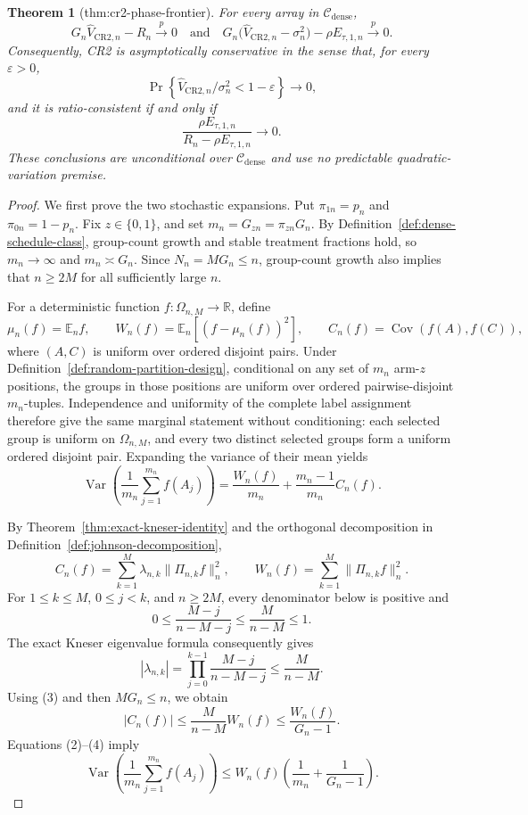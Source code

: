 \documentclass{article}
\newtheorem{theorem}{Theorem}
\begin{document}
\begin{theorem}[thm:cr2-phase-frontier]\label{thm:cr2-phase-frontier}
For every array in \(\mathcal C_{\mathrm{dense}}\),
\[
 G_n\widehat V_{\mathrm{CR2},n}-R_n\xrightarrow{p}0
 \quad\text{and}\quad
 G_n\bigl(\widehat V_{\mathrm{CR2},n}-\sigma_n^2\bigr)
   -\rho E_{\tau,1,n}\xrightarrow{p}0.
\]
Consequently, CR2 is asymptotically conservative in the sense that, for every \(\varepsilon>0\),
\[
 \Pr\!\left\{
   \widehat V_{\mathrm{CR2},n}/\sigma_n^2<1-\varepsilon
 \right\}\longrightarrow0,
\]
and it is ratio-consistent if and only if
\[
 \frac{\rho E_{\tau,1,n}}{R_n-\rho E_{\tau,1,n}}\longrightarrow0.
\]
These conclusions are unconditional over \(\mathcal C_{\mathrm{dense}}\) and use no predictable quadratic-variation premise.
\end{theorem}
\begin{proof}
We first prove the two stochastic expansions.  Put \(\pi_{1n}=p_n\) and \(\pi_{0n}=1-p_n\).  Fix \(z\in\{0,1\}\), and set \(m_n=G_{zn}=\pi_{zn}G_n\).  By Definition~\ref{def:dense-schedule-class}, group-count growth and stable treatment fractions hold, so \(m_n\to\infty\) and \(m_n\asymp G_n\).  Since \(N_n=MG_n\le n\), group-count growth also implies that \(n\ge2M\) for all sufficiently large \(n\).

For a deterministic function \(f:\Omega_{n,M}\to\mathbb R\), define
\[
 \mu_n(f)=\mathbb E_nf,
 \qquad
 W_n(f)=\mathbb E_n\!\left[(f-\mu_n(f))^2\right],
 \qquad
 C_n(f)=\operatorname{Cov}(f(A),f(C)),
 \tag{1}
\]
where \((A,C)\) is uniform over ordered disjoint pairs.  Under Definition~\ref{def:random-partition-design}, conditional on any set of \(m_n\) arm-\(z\) positions, the groups in those positions are uniform over ordered pairwise-disjoint \(m_n\)-tuples.  Independence and uniformity of the complete label assignment therefore give the same marginal statement without conditioning: each selected group is uniform on \(\Omega_{n,M}\), and every two distinct selected groups form a uniform ordered disjoint pair.  Expanding the variance of their mean yields
\[
 \operatorname{Var}\!\left(\frac1{m_n}\sum_{j=1}^{m_n}f(A_j)\right)
 =\frac{W_n(f)}{m_n}+\frac{m_n-1}{m_n}C_n(f).
 \tag{2}
\]

By Theorem~\ref{thm:exact-kneser-identity} and the orthogonal decomposition in Definition~\ref{def:johnson-decomposition},
\[
 C_n(f)=\sum_{k=1}^M\lambda_{n,k}\|\Pi_{n,k}f\|_n^2,
 \qquad
 W_n(f)=\sum_{k=1}^M\|\Pi_{n,k}f\|_n^2.
 \tag{3}
\]
For \(1\le k\le M\), \(0\le j<k\), and \(n\ge2M\), every denominator below is positive and
\[
 0\le\frac{M-j}{n-M-j}\le\frac{M}{n-M}\le1.
\]
The exact Kneser eigenvalue formula consequently gives
\[
 |\lambda_{n,k}|
 =\prod_{j=0}^{k-1}\frac{M-j}{n-M-j}
 \le\frac{M}{n-M}.
\]
Using (3) and then \(MG_n\le n\), we obtain
\[
 |C_n(f)|\le\frac{M}{n-M}W_n(f)
 \le\frac{W_n(f)}{G_n-1}.
 \tag{4}
\]
Equations (2)--(4) imply
\[
 \operatorname{Var}\!\left(\frac1{m_n}\sum_{j=1}^{m_n}f(A_j)\right)
 \le W_n(f)\left(\frac1{m_n}+\frac1{G_n-1}\right).
 \tag{5}
\]


\end{proof}
\end{document}
